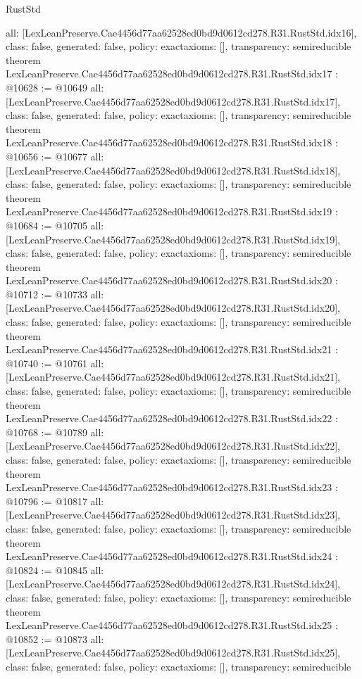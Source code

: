 \begin{lexlean}{RustStd}
\begin{coremodule}
{  all: [LexLeanPreserve.Cae4456d77aa62528ed0bd9d0612cd278.R31.RustStd.idx16],
  class: false,
  generated: false,
  policy: exact{axioms: []},
  transparency: semireducible
}
theorem LexLeanPreserve.Cae4456d77aa62528ed0bd9d0612cd278.R31.RustStd.idx17 : @10628 := @10649 {
  all: [LexLeanPreserve.Cae4456d77aa62528ed0bd9d0612cd278.R31.RustStd.idx17],
  class: false,
  generated: false,
  policy: exact{axioms: []},
  transparency: semireducible
}
theorem LexLeanPreserve.Cae4456d77aa62528ed0bd9d0612cd278.R31.RustStd.idx18 : @10656 := @10677 {
  all: [LexLeanPreserve.Cae4456d77aa62528ed0bd9d0612cd278.R31.RustStd.idx18],
  class: false,
  generated: false,
  policy: exact{axioms: []},
  transparency: semireducible
}
theorem LexLeanPreserve.Cae4456d77aa62528ed0bd9d0612cd278.R31.RustStd.idx19 : @10684 := @10705 {
  all: [LexLeanPreserve.Cae4456d77aa62528ed0bd9d0612cd278.R31.RustStd.idx19],
  class: false,
  generated: false,
  policy: exact{axioms: []},
  transparency: semireducible
}
theorem LexLeanPreserve.Cae4456d77aa62528ed0bd9d0612cd278.R31.RustStd.idx20 : @10712 := @10733 {
  all: [LexLeanPreserve.Cae4456d77aa62528ed0bd9d0612cd278.R31.RustStd.idx20],
  class: false,
  generated: false,
  policy: exact{axioms: []},
  transparency: semireducible
}
theorem LexLeanPreserve.Cae4456d77aa62528ed0bd9d0612cd278.R31.RustStd.idx21 : @10740 := @10761 {
  all: [LexLeanPreserve.Cae4456d77aa62528ed0bd9d0612cd278.R31.RustStd.idx21],
  class: false,
  generated: false,
  policy: exact{axioms: []},
  transparency: semireducible
}
theorem LexLeanPreserve.Cae4456d77aa62528ed0bd9d0612cd278.R31.RustStd.idx22 : @10768 := @10789 {
  all: [LexLeanPreserve.Cae4456d77aa62528ed0bd9d0612cd278.R31.RustStd.idx22],
  class: false,
  generated: false,
  policy: exact{axioms: []},
  transparency: semireducible
}
theorem LexLeanPreserve.Cae4456d77aa62528ed0bd9d0612cd278.R31.RustStd.idx23 : @10796 := @10817 {
  all: [LexLeanPreserve.Cae4456d77aa62528ed0bd9d0612cd278.R31.RustStd.idx23],
  class: false,
  generated: false,
  policy: exact{axioms: []},
  transparency: semireducible
}
theorem LexLeanPreserve.Cae4456d77aa62528ed0bd9d0612cd278.R31.RustStd.idx24 : @10824 := @10845 {
  all: [LexLeanPreserve.Cae4456d77aa62528ed0bd9d0612cd278.R31.RustStd.idx24],
  class: false,
  generated: false,
  policy: exact{axioms: []},
  transparency: semireducible
}
theorem LexLeanPreserve.Cae4456d77aa62528ed0bd9d0612cd278.R31.RustStd.idx25 : @10852 := @10873 {
  all: [LexLeanPreserve.Cae4456d77aa62528ed0bd9d0612cd278.R31.RustStd.idx25],
  class: false,
  generated: false,
  policy: exact{axioms: []},
  transparency: semireducible
}
\end{coremodule}
\end{lexlean}
